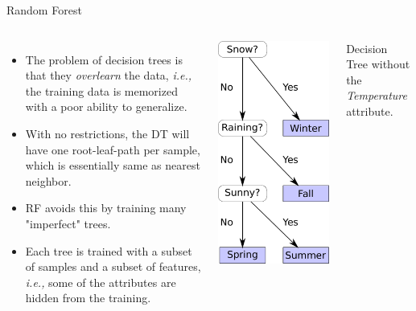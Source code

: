 \documentclass[10pt, aspectratio=169]{beamer} %
\begin{document}
\begin{frame}{Random Forest}
\begin{columns}
\begin{itemize}
\item The problem of decision trees is that they \emph{overlearn} the data,
\emph{i.e.,} the training data is memorized with a poor ability to generalize.
\item With no restrictions, the DT will have one root-leaf-path per sample, which
is essentially same as nearest neighbor.
\item RF avoids this by training many "imperfect" trees.
\item Each tree is trained with a subset of samples and a subset of
features, \emph{i.e.,} some of the attributes are hidden from the training.
\end{itemize}
\centerline{\includegraphics[width=0.8\columnwidth]{DecisionTree_partial.pdf}}
\vspace*{0.01cm}
\par 
{\scriptsize Decision Tree without the \emph{Temperature} attribute.\par}
\end{columns}
\end{frame}
\end{document}

